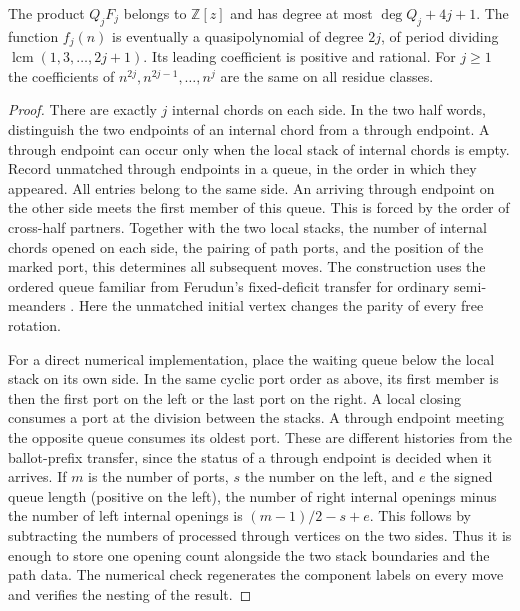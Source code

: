 \begin{theorem}\label{thm:marked-diagonals}
The product \(Q_j F_j\) belongs to \(\mathbb{Z}[z]\) and has
degree at most \(\deg Q_j+4j+1\). The function \(f_j(n)\) is eventually
a quasipolynomial of degree \(2j\), of period dividing
\(\operatorname{lcm}(1,3,\ldots,2j+1)\). Its leading coefficient is
positive and rational. For \(j\ge1\) the coefficients of
\(n^{2j},n^{2j-1},\ldots,n^j\) are the same on all residue classes.
\end{theorem}

\begin{proof}
There are exactly \(j\) internal chords on each side. In the two half
words, distinguish the two endpoints of an internal chord from a through
endpoint. A through endpoint can occur only when the local stack of
internal chords is empty. Record unmatched through endpoints in a queue,
in the order in which they appeared. All entries belong to the same side.
An arriving through endpoint on the other side meets the first member
of this queue. This is forced by the order of cross-half partners.
Together with the two local stacks, the number of internal chords
opened on each side, the pairing of path ports, and the position of the
marked port, this determines all subsequent moves. The construction uses
the ordered queue familiar from Ferudun's fixed-deficit transfer for
ordinary semi-meanders \cite{ferudun2026}. Here the unmatched initial
vertex changes the parity of every free rotation.

For a direct numerical implementation, place the waiting queue below the
local stack on its own side. In the same cyclic port order as above, its
first member is then the first port on the left or the last port on the
right. A local closing consumes a port at the division between the stacks.
A through endpoint meeting the opposite queue consumes its oldest port.
These are different histories from the ballot-prefix transfer, since the
status of a through endpoint is decided when it arrives. If \(m\) is the
number of ports, \(s\) the number on the left, and \(e\) the signed queue
length (positive on the left), the number of right internal openings minus
the number of left internal openings is \((m-1)/2-s+e\). This follows by
subtracting the numbers of processed through vertices on the two sides.
Thus it is enough to store one opening count alongside the two stack
boundaries and the path data. The numerical check regenerates the
component labels on every move and verifies the nesting of the result.


\end{proof}

